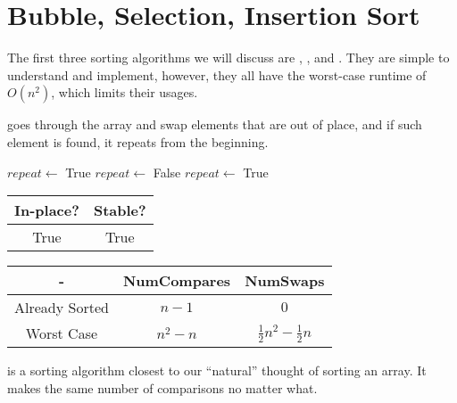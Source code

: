 \section{Bubble, Selection, Insertion Sort}

The first three sorting algorithms we will discuss are , , and . They are simple to understand and implement, however, they all have the worst-case runtime of $O(n^{2})$, which limits their usages.

 goes through the array and swap elements that are out of place, and if such element is found, it repeats from the beginning.

\noindent \hrulefill
\begin{algorithmic}[1]
   
    \State $repeat \gets$ True
      \State $repeat \gets$ False
          \State {} 
          \State $repeat \gets$ True
        \EndIf
      \EndFor
    \EndWhile
    \State {}
  \EndFunction
\end{algorithmic}
\noindent \hrulefill

\begin{center}
  \begin{tabular}{ | c | c | }
    \hline
    In-place? & Stable? \\
    \hline
    True & True \\
    \hline
  \end{tabular}
\end{center}

\begin{center}
  \begin{tabular}{ | c | c | c | }
    \hline
    - & NumCompares & NumSwaps \\
    \hline
    Already Sorted & $n - 1$ & $0$ \\
    \hline
    Worst Case & $n^{2} - n$ & $\frac{1}{2} n^{2} - \frac{1}{2} n$ \\
    \hline
  \end{tabular}
\end{center}

 is a sorting algorithm closest to our ``natural'' thought of sorting an array. It makes the same number of comparisons no matter what.

